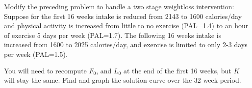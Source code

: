 \begin{problem}
Modify the preceding problem to handle a two stage weightloss intervention:
Suppose for the first 16 weeks intake is reduced from 2143 to 1600 calories/day and physical activity is increased from little to no exercise (PAL=1.4) to an hour of exercise 5 days per week (PAL=1.7).
The following 16 weeks intake is increased from 1600 to 2025 calories/day, and exercise is limited to only 2-3 days per week (PAL=1.5).

You will need to recompute $F_0$, and $L_0$ at the end of the first 16 weeks, but $K$ will stay the same. 
Find and graph the solution curve over the 32 week period.
\end{problem}

